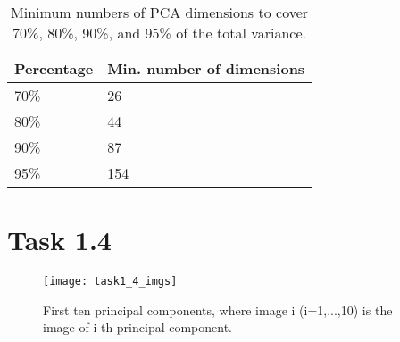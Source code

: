 \documentclass[12pt]{extarticle}
\begin{document}
\begin{table}[h!]
\centering
\caption{Minimum numbers of PCA dimensions to cover 70\%, 80\%, 90\%, and 95\% of the total variance.}
\begin{tabular}{ |p{3cm}|p{3cm}|  }
 \hline
 Percentage&Min. number of dimensions\\
 \hline
 70\%&26\\
 80\%&44\\
 90\%&87\\
 95\%&154\\
 \hline
\end{tabular}
\end{table}
\hfill

\section{Task 1.4}
\begin{figure}[h!]
\caption{First ten principal components, where image i (i=1,...,10) is the image of i-th principal component.}
\centering
\texttt{[image: task1\_4\_imgs]}
\end{figure}
\pagebreak
\end{document}
